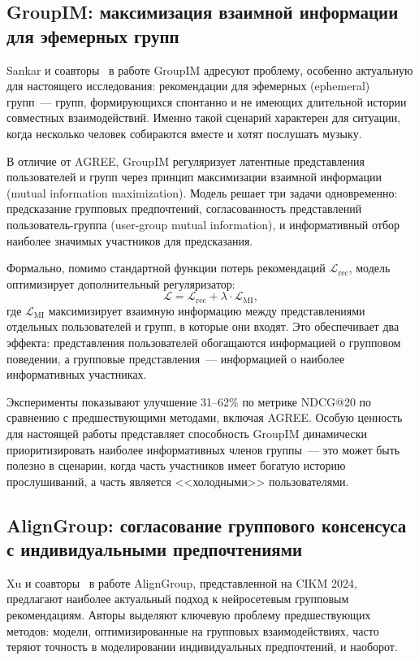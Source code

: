 \subsection{GroupIM: максимизация взаимной информации для эфемерных групп}

Sankar и соавторы~\cite{sankar2020groupim} в работе GroupIM адресуют проблему, особенно актуальную для настоящего исследования: рекомендации для эфемерных (ephemeral) групп~--- групп, формирующихся спонтанно и не имеющих длительной истории совместных взаимодействий. Именно такой сценарий характерен для ситуации, когда несколько человек собираются вместе и хотят послушать музыку.

В отличие от AGREE, GroupIM регуляризует латентные представления пользователей и групп через принцип максимизации взаимной информации (mutual information maximization). Модель решает три задачи одновременно: предсказание групповых предпочтений, согласованность представлений пользователь-группа (user-group mutual information), и информативный отбор наиболее значимых участников для предсказания.

Формально, помимо стандартной функции потерь рекомендаций $\mathcal{L}_{\mathrm{rec}}$, модель оптимизирует дополнительный регуляризатор:
\begin{equation}
    \mathcal{L} = \mathcal{L}_{\mathrm{rec}} + \lambda \cdot \mathcal{L}_{\mathrm{MI}},
\end{equation}
где $\mathcal{L}_{\mathrm{MI}}$ максимизирует взаимную информацию между представлениями отдельных пользователей и групп, в которые они входят. Это обеспечивает два эффекта: представления пользователей обогащаются информацией о групповом поведении, а групповые представления~--- информацией о наиболее информативных участниках.

Эксперименты показывают улучшение 31--62\% по метрике NDCG@20 по сравнению с предшествующими методами, включая AGREE. Особую ценность для настоящей работы представляет способность GroupIM динамически приоритизировать наиболее информативных членов группы~--- это может быть полезно в сценарии, когда часть участников имеет богатую историю прослушиваний, а часть является <<холодными>> пользователями.

\subsection{AlignGroup: согласование группового консенсуса с индивидуальными предпочтениями}

Xu и соавторы~\cite{xu2024aligngroup} в работе AlignGroup, представленной на CIKM 2024, предлагают наиболее актуальный подход к нейросетевым групповым рекомендациям. Авторы выделяют ключевую проблему предшествующих методов: модели, оптимизированные на групповых взаимодействиях, часто теряют точность в моделировании индивидуальных предпочтений, и наоборот.


